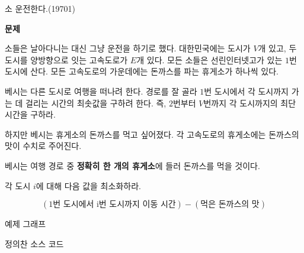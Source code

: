 
\begin{frame}[label=p4]{소 운전한다.(19701)}
\footnotesize

\textbf{문제}

소들은 날아다니는 대신 그냥 운전을 하기로 했다. 대한민국에는 도시가 $V$개 있고,
두 도시를 양방향으로 잇는 고속도로가 $E$개 있다. 모든 소들은 선린인터넷고가 있는
$1$번 도시에 산다. 모든 고속도로의 가운데에는 돈까스를 파는 휴게소가 하나씩 있다.

베시는 다른 도시로 여행을 떠나려 한다. 경로를 잘 골라
$1$번 도시에서 각 도시까지 가는 데 걸리는 시간의 최솟값을 구하려 한다.
즉, $2$번부터 $V$번까지 각 도시까지의 최단 시간을 구하라.

하지만 베시는 휴게소의 돈까스를 먹고 싶어졌다.
각 고속도로의 휴게소에는 돈까스의 맛이 수치로 주어진다.

베시는 여행 경로 중 \textbf{정확히 한 개의 휴게소}에 들러 돈까스를 먹을 것이다.

각 도시 $i$에 대해 다음 값을 최소화하라.

\[
(\text{1번 도시에서 i번 도시까지 이동 시간}) - (\text{먹은 돈까스의 맛})
\]
\end{frame}

\begin{frame}{예제 그래프}

\begin{center}
\end{center}

\end{frame}


\begin{frame}{정의찬 소스 코드}
\inputminted{java}{../src/\prob/uichan/Main.java}
\end{frame}

